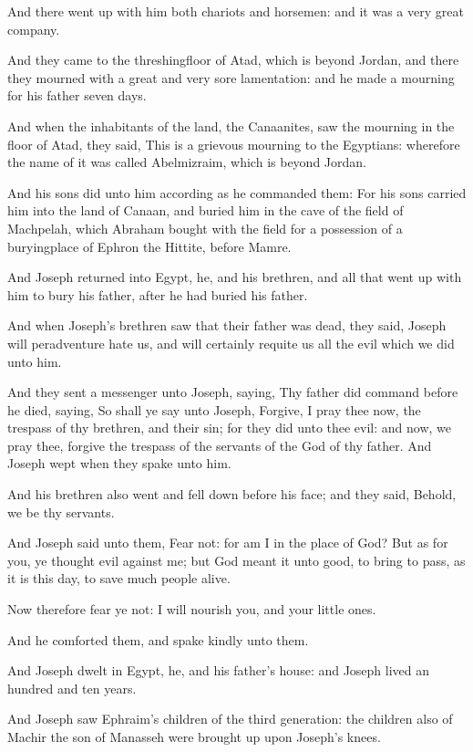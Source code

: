 \verse And there went up with him both chariots and horsemen: and it was a very great company.

\verse And they came to the threshingfloor of Atad, which is beyond Jordan, and there they mourned with a great and very sore lamentation: and he made a mourning for his father seven days.

\verse And when the inhabitants of the land, the Canaanites, saw the mourning in the floor of Atad, they said, This is a grievous mourning to the Egyptians: wherefore the name of it was called Abelmizraim, which is beyond Jordan.

\verse And his sons did unto him according as he commanded them: \verse For his sons carried him into the land of Canaan, and buried him in the cave of the field of Machpelah, which Abraham bought with the field for a possession of a buryingplace of Ephron the Hittite, before Mamre.

\verse And Joseph returned into Egypt, he, and his brethren, and all that went up with him to bury his father, after he had buried his father.

\verse And when Joseph's brethren saw that their father was dead, they said, Joseph will peradventure hate us, and will certainly requite us all the evil which we did unto him.

\verse And they sent a messenger unto Joseph, saying, Thy father did command before he died, saying, \verse So shall ye say unto Joseph, Forgive, I pray thee now, the trespass of thy brethren, and their sin; for they did unto thee evil: and now, we pray thee, forgive the trespass of the servants of the God of thy father. And Joseph wept when they spake unto him.

\verse And his brethren also went and fell down before his face; and they said, Behold, we be thy servants.

\verse And Joseph said unto them, Fear not: for am I in the place of God?  \verse But as for you, ye thought evil against me; but God meant it unto good, to bring to pass, as it is this day, to save much people alive.

\verse Now therefore fear ye not: I will nourish you, and your little ones.

And he comforted them, and spake kindly unto them.

\verse And Joseph dwelt in Egypt, he, and his father's house: and Joseph lived an hundred and ten years.

\verse And Joseph saw Ephraim's children of the third generation: the children also of Machir the son of Manasseh were brought up upon Joseph's knees.

